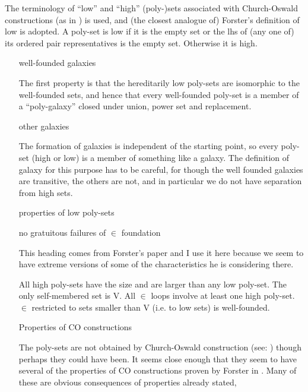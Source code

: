 \documentclass[numreferences]{rbjk}
\begin{document}
\begin{article}
The terminology of ``low'' and ``high'' (poly-)sets associated with Church-Oswald constructions (as in \cite{forster92,forster2005}) is used, and (the closest analogue of) Forster's definition of low is adopted.
A poly-set is low if it is the empty set or the lhs of (any one of) its ordered pair representatives is the empty set.
Otherwise it is high.

\begin{itemize}

\item[well-founded galaxies]\ 

The first property is that the hereditarily low poly-sets are isomorphic to the well-founded sets, and hence that every well-founded poly-set is a member of a ``poly-galaxy'' closed under union, power set and replacement.

\item[other galaxies]\ 

The formation of galaxies is independent of the starting point, so every poly-set (high or low) is a member of something like a galaxy.
The definition of galaxy for this purpose has to be careful, for though the well founded galaxies are transitive, the others are not, and in particular we do not have separation from high sets.

\item[properties of low poly-sets]\ 

\item[no gratuitous failures of $\in$ foundation]\ 

This heading comes from Forster's paper \cite{forster2006} and I use it here because we seem to have extreme versions of some of the characteristics he is considering there.

All high poly-sets have the size and are larger than any low poly-set.
The only self-membered set is V.
All $\in$ loops involve at least one high poly-set.
$\in$ restricted to sets smaller than V (i.e. to low sets) is well-founded.


\item[Properties of CO constructions]\ 

The poly-sets are not obtained by Church-Oswald construction (see: \cite{forster2005}) though perhaps they could have been.
It seems close enough that they seem to have several of the properties of CO constructions proven by Forster in \cite{forster2005}.
Many of these are obvious consequences of properties already stated,

\begin{itemize}


\end{itemize}
\end{itemize}
\end{article}
\end{document}
